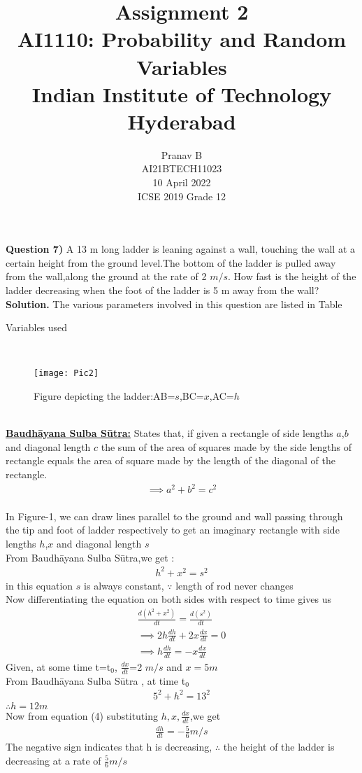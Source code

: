 \documentclass[journal,12pt,twocolumn]{IEEEtran}
\title{Assignment 2 \\ \Large AI1110: Probability and Random Variables \\ \large Indian Institute of Technology Hyderabad}
\author{Pranav B \\ \normalsize AI21BTECH11023 \\ \vspace*{20pt} \normalsize  10 April 2022 \\ \vspace*{20pt} \Large ICSE 2019 Grade 12}
\begin{document}
	\maketitle
	
	\textbf{Question 7)} 
	A 13 m long ladder is leaning against a wall, touching the wall at a certain height from the ground level.The bottom of the ladder is pulled away from the wall,along the ground at the rate of 2 $m/s$. How fast is the height of the ladder decreasing when the foot of the ladder is 5 m away from the wall?\\
	\textbf{Solution.}
	The various parameters involved in this question are listed in Table \begin{table}[h]
\caption{Variables used}

\end{table}
\\
\begin{figure}[h]
\texttt{[image: Pic2]}
\caption{Figure depicting the ladder:AB=$s$,BC=$x$,AC=$h$}
\label{fig:my_label}
\end{figure}
\\
\underline{\textbf{Baudhāyana Sulba Sūtra:}}
States that, if given a rectangle of side lengths $a$,$b$ and diagonal length $c$ the sum of the area of squares made by the side lengths of rectangle equals the area of square made by the length of the diagonal of the rectangle.\\
\begin{align}
\implies a^2+b^2=c^2
\end{align}
\\
In Figure-1, we can draw lines parallel to the ground and wall passing through the tip and foot of ladder respectively to get an imaginary rectangle with side lengths $h$,$x$ and diagonal length $s$\\
From Baudhāyana Sulba Sūtra,we get :
\begin{align}
h^2+x^2=s^2
\end{align}
in this equation $s$ is always constant,
 $\because$ length of rod never changes\\
 Now differentiating the equation on both sides with respect to time gives us\\
 \begin{align}
 \frac{d(h^2+x^2)}{dt}=\frac{d(s^2)}{dt}\\
  \implies 2h\frac{dh}{dt}+2x\frac{dx}{dt}=0\\
 \implies h\frac{dh}{dt}=-x\frac{dx}{dt}
 \end{align}
 Given, at some time t=t$_0$,
  $\frac{dx}{dt}$=2 $m/s$ and $x= 5 m$\\
  From Baudhāyana Sulba Sūtra , at time t$_0$
  \begin{align}
  5^2+h^2=13^2
  \end{align}
  $\therefore h= 12 m$\\
  Now from equation (4) substituting $h,x,\frac{dx}{dt}$,we get\\
  \begin{align}
   \frac{dh}{dt}=-\frac{5}{6} m/s
\end{align}  
The negative sign indicates that h is decreasing,
$\therefore$ the height of the ladder is decreasing at a rate of $\frac{5}{6} m/s$
\end{document}

